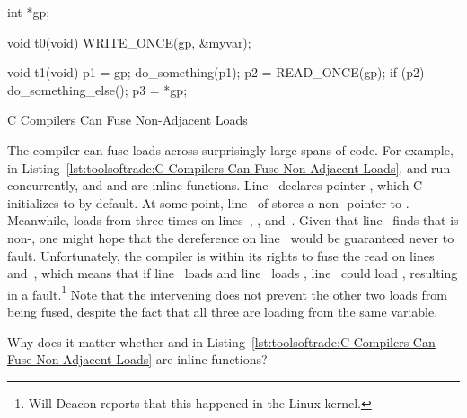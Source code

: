 \begin{listing}[tbp]
\begin{linelabel}
\begin{VerbatimL}[commandchars=\\\[\]]
int *gp; \lnlbl[gp]

void t0(void)
{
	WRITE_ONCE(gp, &myvar); \lnlbl[wgp]
}

void t1(void)
{
	p1 = gp; \lnlbl[p1]
	do_something(p1);
	p2 = READ_ONCE(gp); \lnlbl[p2]
	if (p2) { \lnlbl[if]
		do_something_else();
		p3 = *gp; \lnlbl[p3]
	}
}
\end{VerbatimL}
\end{linelabel}
\caption{C Compilers Can Fuse Non-Adjacent Loads}
\label{lst:toolsoftrade:C Compilers Can Fuse Non-Adjacent Loads}
\end{listing}

\begin{lineref}
The compiler can fuse loads across surprisingly large spans of code.
For example, in
Listing~\ref{lst:toolsoftrade:C Compilers Can Fuse Non-Adjacent Loads},
 and  run concurrently, and  and
 are inline functions.
Line~ declares pointer , which C initializes to 
by default.
At some point, line~ of  stores a non-
pointer to .
Meanwhile,  loads from  three times on
lines~, , and~.
Given that line~ finds that  is non-, one might
hope that the dereference on line~ would be guaranteed never
to fault.
Unfortunately, the compiler is within its rights to fuse the read on
lines~ and~, which means that if line~
loads  and line~ loads , line~
could load , resulting in a fault.\footnote{
	Will Deacon reports that this happened in the Linux kernel.}
Note that the intervening  does not prevent the other
two loads from being fused, despite the fact that all three are loading
from the same variable.
\end{lineref}

\QuickQuiz{}
	Why does it matter whether  and
	 in
	Listing~\ref{lst:toolsoftrade:C Compilers Can Fuse Non-Adjacent Loads}
	are inline functions?
 \QuickQuizEnd

